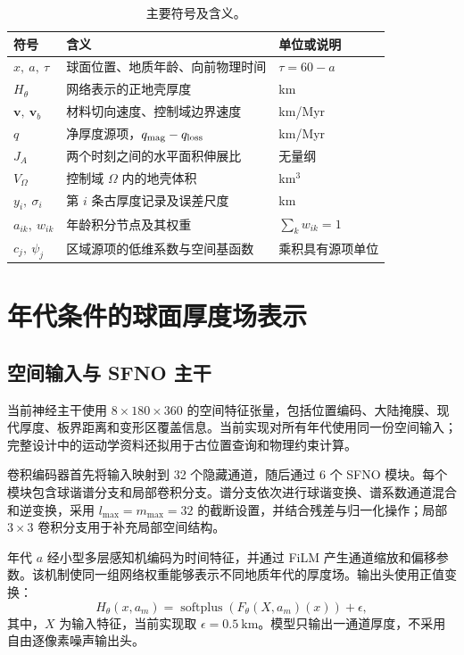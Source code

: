 \documentclass[UTF8,zihao=-4,fontset=none,a4paper]{ctexart}
\begin{document}
\begin{table}[htbp]
  \centering
  \caption{主要符号及含义。}
  \label{tab:symbols}
  \small
  \begin{tabularx}{\linewidth}{@{}lXl@{}}
    \toprule
    符号 & 含义 & 单位或说明 \\
    \midrule
    $x,\ a,\ \tau$ & 球面位置、地质年龄、向前物理时间 & $\tau=60-a$ \\
    $H_\theta$ & 网络表示的正地壳厚度 & km \\
    $\mathbf v,\ \mathbf v_b$ & 材料切向速度、控制域边界速度 & km/Myr \\
    $q$ & 净厚度源项，$q_{\rm mag}-q_{\rm loss}$ & km/Myr \\
    $J_A$ & 两个时刻之间的水平面积伸展比 & 无量纲 \\
    $V_\Omega$ & 控制域 $\Omega$ 内的地壳体积 & km$^3$ \\
    $y_i,\ \sigma_i$ & 第 $i$ 条古厚度记录及误差尺度 & km \\
    $a_{ik},\ w_{ik}$ & 年龄积分节点及其权重 & $\sum_k w_{ik}=1$ \\
    $c_j,\ \psi_j$ & 区域源项的低维系数与空间基函数 & 乘积具有源项单位 \\
    \bottomrule
  \end{tabularx}
\end{table}

\section{年代条件的球面厚度场表示}

\subsection{空间输入与 SFNO 主干}

当前神经主干使用 $8\times180\times360$ 的空间特征张量，包括位置编码、大陆掩膜、现代厚度、板界距离和变形区覆盖信息。当前实现对所有年代使用同一份空间输入；完整设计中的运动学资料还拟用于古位置查询和物理约束计算。

卷积编码器首先将输入映射到 32 个隐藏通道，随后通过 6 个 SFNO 模块。每个模块包含球谐谱分支和局部卷积分支。谱分支依次进行球谐变换、谱系数通道混合和逆变换，采用 $l_{\max}=m_{\max}=32$ 的截断设置，并结合残差与归一化操作；局部 $3\times3$ 卷积分支用于补充局部空间结构。

年代 $a$ 经小型多层感知机编码为时间特征，并通过 FiLM 产生通道缩放和偏移参数。该机制使同一组网络权重能够表示不同地质年代的厚度场。输出头使用正值变换：
\begin{equation}
  H_\theta(x,a_m)
  =\operatorname{softplus}\!\left(F_\theta(X,a_m)(x)\right)+\epsilon,
  \label{eq:field}
\end{equation}
其中，$X$ 为输入特征，当前实现取 $\epsilon=0.5\ \mathrm{km}$。模型只输出一通道厚度，不采用自由逐像素噪声输出头。
\end{document}
